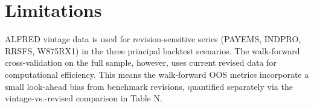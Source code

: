 \documentclass[conference,onecolumn]{IEEEtran}
\begin{document}
\section{Limitations}
ALFRED vintage data is used for revision-sensitive series (PAYEMS, INDPRO, RRSFS, W875RX1) in the three principal backtest scenarios. The walk-forward cross-validation on the full sample, however, uses current revised data for computational efficiency. This means the walk-forward OOS metrics incorporate a small look-ahead bias from benchmark revisions, quantified separately via the vintage-vs.-revised comparison in Table N.
\end{document}

